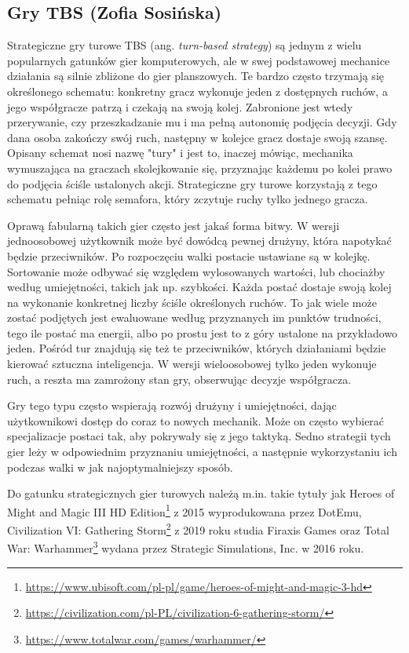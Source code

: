 \subsection{Gry TBS (Zofia Sosińska)}\label{ss:tbs}
Strategiczne gry turowe TBS (ang. \textit{turn-based strategy}) są jednym z wielu popularnych gatunków gier komputerowych, ale w swej podstawowej mechanice działania są silnie zbliżone do
gier planszowych. Te bardzo często trzymają się określonego schematu: konkretny gracz wykonuje jeden z dostępnych ruchów, a jego współgracze patrzą i czekają 
na swoją kolej. Zabronione jest wtedy przerywanie, czy przeszkadzanie mu i ma pełną autonomię podjęcia decyzji. Gdy dana osoba zakończy swój ruch, następny w kolejce gracz
dostaje swoją szansę. Opisany schemat nosi nazwę "tury" i jest to, inaczej mówiąc, mechanika wymuszająca na graczach skolejkowanie się, przyznając każdemu po kolei
prawo do podjęcia ściśle ustalonych akcji. Strategiczne gry turowe korzystają z tego schematu pełniąc rolę semafora, który zczytuje ruchy tylko jednego gracza.

Oprawą fabularną takich gier często jest jakaś forma bitwy. W wersji jednoosobowej użytkownik może być dowódcą pewnej drużyny, która napotykać będzie przeciwników. Po 
rozpoczęciu walki postacie ustawiane są w kolejkę. Sortowanie może odbywać się względem wylosowanych wartości, lub chociażby według umiejętności, takich jak np. szybkości. Każda postać
 dostaje swoją kolej na wykonanie konkretnej liczby ściśle określonych ruchów. To jak wiele może zostać podjętych jest ewaluowane według przyznanych im punktów 
 trudności, tego ile postać ma energii, albo po prostu jest to z góry ustalone na przykładowo jeden. Pośród tur znajdują się też te przeciwników, których działaniami będzie 
 kierować sztuczna inteligencja. W wersji wieloosobowej tylko jeden wykonuje ruch, a reszta ma zamrożony stan gry, obserwując decyzje współgracza.

Gry tego typu często wspierają rozwój drużyny i umiejętności, dając użytkownikowi dostęp do coraz to nowych mechanik. Może on często wybierać specjalizacje postaci tak, aby 
pokrywały się z jego taktyką. Sedno strategii tych gier leży w odpowiednim przyznaniu umiejętności, a następnie wykorzystaniu ich podczas walki w jak najoptymalniejszy sposób.

Do gatunku strategicznych gier turowych należą m.in. takie tytuły jak Heroes of Might and Magic III HD Edition\footnote{\url{https://www.ubisoft.com/pl-pl/game/heroes-of-might-and-magic-3-hd}} z 2015 wyprodukowana przez DotEmu, 
Civilization VI: Gathering Storm\footnote{\url{https://civilization.com/pl-PL/civilization-6-gathering-storm/}} z 2019 roku studia Firaxis Games oraz Total War: Warhammer\footnote{\url{https://www.totalwar.com/games/warhammer/}} wydana przez Strategic Simulations, Inc. w 2016 roku.
